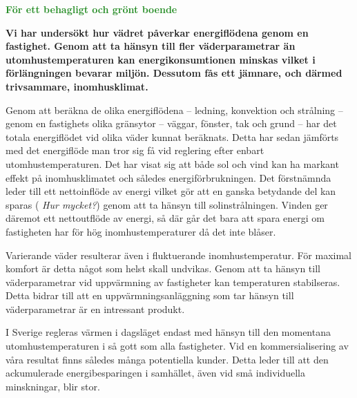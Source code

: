 \documentclass[11pt,a4paper]{article}
\begin{document}
\addtolength{\parindent}{-0.6 cm}
\pagestyle{fancy}
\rhead{\sc\footnotesize \today}
\mbox{}

\begin{center}
\textcolor{ForestGreen}{\textbf{\Huge För ett behagligt och grönt boende}}
\end{center}

\mbox{}

\setlength{\columnsep}{5mm}
\begin{multicols}{2}
\addtolength{\parskip}{1.2ex}
\linespread{1.02}
\normalsize



\textbf{Vi har undersökt hur vädret påverkar energiflödena genom en fastighet. Genom att ta hänsyn till fler väderparametrar än utomhustemperaturen kan energikonsumtionen minskas vilket i förlängningen bevarar miljön. Dessutom fås ett jämnare, och därmed trivsammare, inomhusklimat.}

Genom att beräkna de olika energiflödena – ledning, konvektion och strålning – genom en fastighets olika gränsytor – väggar, fönster, tak och grund – har det totala energiflödet vid olika väder kunnat beräknats. Detta har sedan jämförts med det energiflöde man tror sig få vid reglering efter enbart utomhustemperaturen. 
Det har visat sig att både sol och vind kan
ha markant effekt på inomhusklimatet och således energiförbrukningen. Det 
förstnämnda leder till ett nettoinflöde av energi vilket gör att en ganska
betydande del kan sparas (\emph{\color{red} Hur mycket?}) genom att ta hänsyn till solinstrålningen. Vinden
ger däremot ett nettoutflöde av energi, så där går det bara att spara energi
om fastigheten har för hög inomhus\-temperaturer då det inte blåser.

Varierande väder resulterar även i fluktuerande inomhustemperatur. För maximal komfort är detta något som helst skall undvikas. Genom att ta hänsyn till väderparametrar vid uppvärmning av fastigheter kan temperaturen stabilseras. Detta bidrar till att en uppvärmningsanläggning som tar hänsyn till väderparametrar är en intressant produkt.

I Sverige regleras värmen i dagsläget endast med hänsyn till den momentana utomhustemperaturen i så gott som alla fastigheter. Vid en kommersialisering av våra
resultat finns således många potentiella kunder. Detta leder till att den ackumulerade energibesparingen i samhället, även vid små individuella minskningar, blir stor.


\end{multicols}
\end{document}
